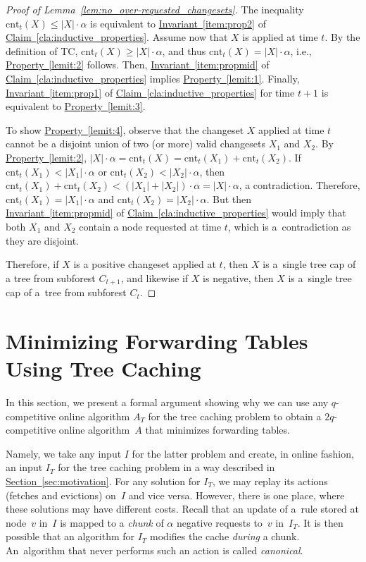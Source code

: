 \documentclass[sigconf,screen=true]{acmart}
\newcommand{\lref}[2][]{\hyperref[#2]{#1~\ref*{#2}}}
\newcommand{\ALG}{\textsc{TC}\xspace}
\newcommand{\cnt}{\textrm{cnt}}
\begin{document}
\begin{proof}[Proof of Lemma~\ref*{lem:no_over-requested_changesets}]
The inequality $\cnt_t(X) \leq |X| \cdot \alpha$ is equivalent to
\lref[Invariant]{item:prop2} of \lref[Claim]{cla:inductive_properties}.
Assume now that $X$ is applied at time $t$. By the definition of \ALG,
$\cnt_t(X) \geq |X| \cdot \alpha$, and thus $\cnt_t(X) = |X| \cdot \alpha$,
i.e., \lref[Property]{lemit:2} follows. Then, \lref[Invariant]{item:propmid}
of \lref[Claim]{cla:inductive_properties} implies \lref[Property]{lemit:1}.
Finally, \lref[Invariant]{item:prop1} of
\lref[Claim]{cla:inductive_properties} for time $t+1$ is equivalent to
\lref[Property]{lemit:3}.

To show \lref[Property]{lemit:4}, observe that the changeset $X$
applied at time $t$ cannot be a disjoint union of two (or more) valid
changesets $X_1$ and $X_2$. By \lref[Property]{lemit:2}, $|X| \cdot \alpha =
\cnt_t(X) = \cnt_t(X_1) + \cnt_t(X_2)$. If $\cnt_t(X_1) < |X_1| \cdot \alpha$
or $\cnt_t(X_2) < |X_2| \cdot \alpha$, then $\cnt_t(X_1) + \cnt_t(X_2) <
(|X_1| + |X_2|) \cdot \alpha = |X| \cdot \alpha$, a contradiction. Therefore,
$\cnt_t(X_1) = |X_1| \cdot \alpha$ and $\cnt_t(X_2) = |X_2| \cdot
\alpha$. But then \lref[Invariant]{item:propmid} of
\lref[Claim]{cla:inductive_properties} would imply that both $X_1$ and $X_2$
contain a node requested at time $t$, which is a~contradiction as they are
disjoint.

Therefore, if $X$ is a positive changeset applied at $t$, then $X$ is a~single
tree cap of a tree from subforest $C_{t+1}$, and likewise if $X$ is negative,
then $X$ is a~single tree cap of a~tree from subforest $C_t$.
\end{proof}



\section{Minimizing Forwarding Tables Using Tree Caching}
\label{sec:bisimulation}

In this section, we present a formal argument showing why we can use any
$q$-competitive online algorithm $A_T$ for the tree caching problem to obtain
a $2 q$-competitive online algorithm~$A$ that minimizes forwarding tables.

Namely, we take any input $I$ for the latter problem and create, in online
fashion, an input $I_T$ for the tree caching problem in a way described in
\lref[Section]{sec:motivation}.
For any solution for $I_T$, we may replay its actions (fetches and evictions)
on~$I$ and vice versa. However, there is one place, where these solutions 
may have different costs. Recall that an update of a~rule stored at node~$v$
in~$I$ is mapped to a \emph{chunk} of $\alpha$ negative requests to~$v$ 
in~$I_T$. It is then possible that an algorithm for $I_T$ modifies the cache
\emph{during} a chunk. An~algorithm that never performs such an action
is called \emph{canonical}.
\end{document}
